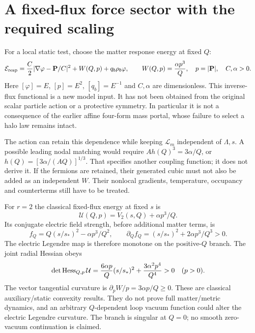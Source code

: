 \documentclass[11pt]{article}
\begin{document}
\section{A fixed-flux force sector with the required scaling}
For a local static test, choose the matter response energy at fixed $Q$:
\begin{equation}
 \mathcal E_{\rm resp}={C\over2}
       |\nabla\varphi-\mathbf P/C|^2
       +W(Q,p)+q_b\rho_b\varphi,\qquad
 W(Q,p)={\alpha p^3\over Q},\quad p=|\mathbf P|,
 \quad C,\alpha>0.
 \label{pf:force}
\end{equation}
Here $[\varphi]=E$, $[p]=E^2$, $[q_b]=E^{-1}$ and $C,\alpha$ are
dimensionless. This inverse-flux functional is a new model input. It has
not been obtained from the original scalar particle action or a protective
symmetry. In particular it is not a consequence of the earlier affine
four-form mass portal, whose failure to select a halo law remains intact.

The action can retain this dependence while keeping $\mathcal L_m$
independent of $\Lambda,s$. A possible leading nodal matching would
require $A h(Q)^3=3\alpha/Q$, or
$h(Q)=[3\alpha/(AQ)]^{1/3}$. That specifies another coupling function;
it does not derive it. If the fermions are retained, their generated cubic
must not also be added as an independent $W$. Their nonlocal gradients,
temperature, occupancy and counterterms still have to be treated.

For $r=2$ the classical fixed-flux energy at fixed $s$ is
\begin{equation}
 \mathcal U(Q,p)=V_2(s,Q)+\alpha p^3/Q.
\end{equation}
Its conjugate electric field strength, before additional matter terms, is
\begin{equation}
 f_Q=Q(s/s_*)^2-\alpha p^3/Q^2,\qquad
 \partial_Qf_Q=(s/s_*)^2+2\alpha p^3/Q^3>0.
\end{equation}
The electric Legendre map is therefore monotone on the positive-$Q$
branch. The joint radial Hessian obeys
\begin{equation}
 \det\operatorname{Hess}_{Q,p}\mathcal U
 ={6\alpha p\over Q}(s/s_*)^2
             +{3\alpha^2p^4\over Q^4}>0\quad(p>0).
\end{equation}
The vector tangential curvature is $\partial_pW/p=3\alpha p/Q\geq0$.
These are classical auxiliary/static convexity results. They do not prove
full matter/metric dynamics, and an arbitrary $Q$-dependent loop vacuum
function could alter the electric Legendre curvature. The branch is
singular at $Q=0$; no smooth zero-vacuum continuation is claimed.
\end{document}
